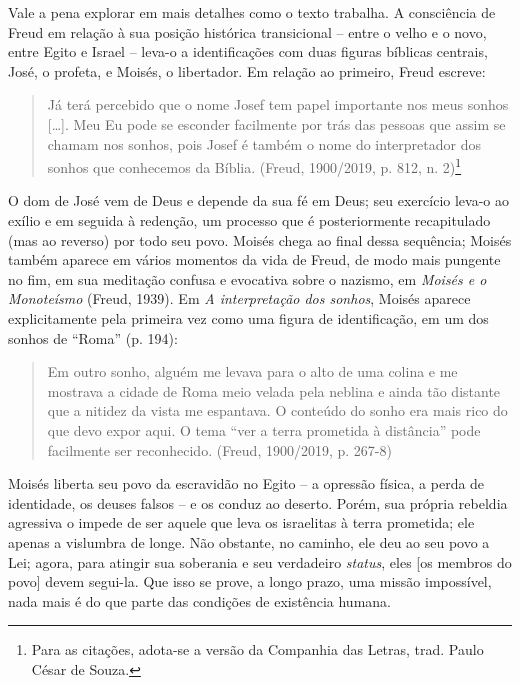 Vale a pena explorar em mais detalhes como o texto trabalha. A
consciência de Freud em relação à sua posição histórica transicional --
entre o velho e o novo, entre Egito e Israel -- leva-o a identificações
com duas figuras bíblicas centrais, José, o profeta, e Moisés, o
libertador. Em relação ao primeiro, Freud escreve:

\begin{quote}
Já terá percebido que o nome Josef tem papel importante nos meus sonhos
{[}\ldots{}{]}. Meu Eu pode se esconder facilmente por trás das pessoas que
assim se chamam nos sonhos, pois Josef é também o nome do interpretador
dos sonhos que conhecemos da Bíblia. (Freud, 1900/2019, p. 812, n.
2)\footnote{Para as citações, adota-se a versão da Companhia das Letras,
  trad. Paulo César de Souza.}
\end{quote}

O dom de José vem de Deus e depende da sua fé em Deus; seu exercício
leva-o ao exílio e em seguida à redenção, um processo que é
posteriormente recapitulado (mas ao reverso) por todo seu povo. Moisés
chega ao final dessa sequência; Moisés também aparece em vários momentos
da vida de Freud, de modo mais pungente no fim, em sua meditação confusa
e evocativa sobre o nazismo, em \emph{Moisés e o Monoteísmo} (Freud,
1939). Em \emph{A interpretação dos sonhos}, Moisés aparece
explicitamente pela primeira vez como uma figura de identificação, em um
dos sonhos de ``Roma'' (p. 194):

\begin{quote}
Em outro sonho, alguém me levava para o alto de uma colina e me mostrava
a cidade de Roma meio velada pela neblina e ainda tão distante que a
nitidez da vista me espantava. O conteúdo do sonho era mais rico do que
devo expor aqui. O tema ``ver a terra prometida à distância'' pode
facilmente ser reconhecido. (Freud, 1900/2019, p. 267-8)
\end{quote}

Moisés liberta seu povo da escravidão no Egito -- a opressão física, a
perda de identidade, os deuses falsos -- e os conduz ao deserto. Porém,
sua própria rebeldia agressiva o impede de ser aquele que leva os
israelitas à terra prometida; ele apenas a vislumbra de longe. Não
obstante, no caminho, ele deu ao seu povo a Lei; agora, para atingir sua
soberania e seu verdadeiro \emph{status}, eles {[}os membros do povo{]}
devem segui-la. Que isso se prove, a longo prazo, uma missão impossível,
nada mais é do que parte das condições de existência humana.

